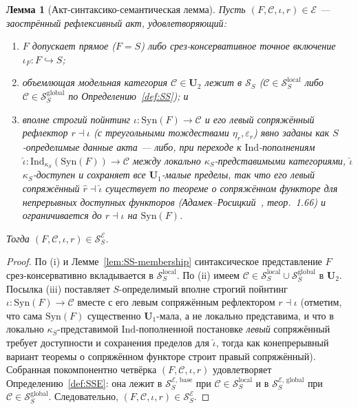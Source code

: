 \documentclass[11pt]{article}
\theoremstyle{plain}
\newtheorem{lemma}[theorem]{Лемма}
\theoremstyle{definition}
\newcommand{\cS}{\mathcal{S}}
\newcommand{\cC}{\mathcal{C}}
\newcommand{\Syn}{\mathrm{Syn}}
\newcommand{\cE}{\mathcal{E}}
\newcommand{\SSE}{\cS_{S}^{\cE}}
\newcommand{\SSEbase}{\cS_{S}^{\cE,\,\mathrm{base}}}
\newcommand{\SSEglobal}{\cS_{S}^{\cE,\,\mathrm{global}}}
\begin{document}
\begin{lemma}[Акт-синтаксико-семантическая лемма]\label{lem:SS-membership-E}
Пусть $(F, \cC, \iota, r) \in \cE$ — заострённый рефлексивный акт, удовлетворяющий:
\begin{enumerate}[nosep,label=(\roman*)]
\item $F$ допускает прямое ($F = S$) либо срез-консервативное точное включение $\iota_F : F \hookrightarrow S$;
\item объемлющая модельная категория $\cC \in \mathbf{U}_2$ лежит в $\cS_S$ ($\cC \in \cS_S^{\mathrm{local}}$ либо $\cC \in \cS_S^{\mathrm{global}}$ по Определению~\ref{def:SS}); и
\item вполне строгий пойнтинг $\iota : \Syn(F) \to \cC$ и его левый сопряжённый рефлектор $r \dashv \iota$ (с треугольными тождествами $\eta_r, \varepsilon_r$) явно заданы как $S$-определимые данные акта --- либо, при переходе к $\mathrm{Ind}$-пополнениям $\widehat{\iota} : \mathrm{Ind}_{\kappa_S}(\Syn(F)) \to \cC$ между локально $\kappa_S$-представимыми категориями, $\widehat{\iota}$ $\kappa_S$-доступен и сохраняет все $\mathbf{U}_1$-малые пределы, так что его левый сопряжённый $\widehat{r} \dashv \widehat{\iota}$ существует по теореме о сопряжённом функторе для непрерывных доступных функторов (Адамек--Росицкий~\cite{AdamekRosicky1994}, теор.~1.66) и ограничивается до $r \dashv \iota$ на $\Syn(F)$.
\end{enumerate}
Тогда $(F, \cC, \iota, r) \in \SSE$.
\end{lemma}

\begin{proof}
По (i) и Лемме~\ref{lem:SS-membership} синтаксическое представление $F$ срез-консервативно вкладывается в $\cS_S^{\mathrm{local}}$. По (ii) имеем $\cC \in \cS_S^{\mathrm{local}} \cup \cS_S^{\mathrm{global}}$ в $\mathbf{U}_2$. Посылка (iii) поставляет $S$-определимый вполне строгий пойнтинг $\iota : \Syn(F) \to \cC$ вместе с его левым сопряжённым рефлектором $r \dashv \iota$ (отметим, что сама $\Syn(F)$ существенно $\mathbf{U}_1$-мала, а не локально представима, и что в локально $\kappa_S$-представимой $\mathrm{Ind}$-пополненной постановке \emph{левый} сопряжённый требует доступности и сохранения пределов для $\widehat{\iota}$, тогда как конепрерывный вариант теоремы о сопряжённом функторе строит правый сопряжённый). Собранная покомпонентно четвёрка $(F, \cC, \iota, r)$ удовлетворяет Определению~\ref{def:SSE}: она лежит в $\SSEbase$ при $\cC \in \cS_S^{\mathrm{local}}$ и в $\SSEglobal$ при $\cC \in \cS_S^{\mathrm{global}}$. Следовательно, $(F, \cC, \iota, r) \in \SSE$.
\end{proof}
\end{document}
